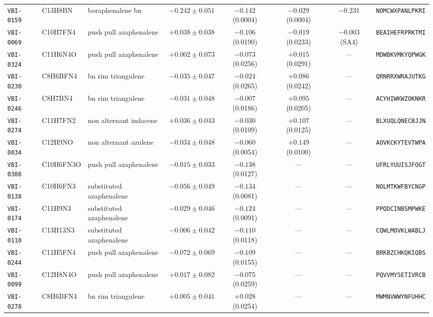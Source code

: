 \documentclass[10pt,a4paper]{article}
\begin{document}
\begin{table}[htbp]
{\begin{tabular}{@{}lllccccc@{}}
\texttt{VBI-0159} & C13H8BN & boraphenalene bn & $-0.242\pm0.051$ & $-0.142$ (0.0004) & $-0.029$ (0.0004) & $-0.231$ & \texttt{\tiny NOMCWXPANLPKRI} \\
\texttt{VBI-0069} & C10H7FN4 & push pull azaphenalene & $+0.038\pm0.038$ & $-0.106$ (0.0190) & $-0.019$ (0.0233) & $-0.003$ (SA4) & \texttt{\tiny BEAIHEFRPRKTMI} \\
\texttt{VBI-0324} & C11H6N4O & push pull azaphenalene & $+0.002\pm0.073$ & $-0.073$ (0.0256) & $+0.015$ (0.0291) & --- & \texttt{\tiny MDWBKVMKYQPWGK} \\
\texttt{VBI-0230} & C8H6BFN4 & bn rim triangulene & $-0.035\pm0.047$ & $-0.024$ (0.0265) & $+0.086$ (0.0242) & --- & \texttt{\tiny QRNRRXWRAJUTKG} \\
\texttt{VBI-0246} & C8H7BN4 & bn rim triangulene & $-0.031\pm0.048$ & $-0.007$ (0.0186) & $+0.095$ (0.0205) & --- & \texttt{\tiny ACYHIWKWZOKNKR} \\
\texttt{VBI-0274} & C11H7FN2 & non alternant indacene & $+0.036\pm0.043$ & $-0.030$ (0.0109) & $+0.107$ (0.0125) & --- & \texttt{\tiny BLXUQLQNECBJJN} \\
\texttt{VBI-0034} & C12H9NO & non alternant azulene & $-0.034\pm0.048$ & $-0.060$ (0.0054) & $+0.149$ (0.0100) & --- & \texttt{\tiny AOVKCKYTEVTWPA} \\
\texttt{VBI-0308} & C10H6FN3O & push pull azaphenalene & $-0.015\pm0.033$ & $-0.138$ (0.0127) & --- & --- & \texttt{\tiny UFRLYUUISJFOGT} \\
\texttt{VBI-0138} & C10H6FN3 & substituted azaphenalene & $-0.056\pm0.049$ & $-0.134$ (0.0081) & --- & --- & \texttt{\tiny NOLMTKWFBYCNGP} \\
\texttt{VBI-0174} & C11H9N3 & substituted azaphenalene & $-0.029\pm0.046$ & $-0.124$ (0.0091) & --- & --- & \texttt{\tiny PPQDCINBSMPWKE} \\
\texttt{VBI-0110} & C13H13N3 & substituted azaphenalene & $-0.006\pm0.042$ & $-0.110$ (0.0118) & --- & --- & \texttt{\tiny CQWLMOVKLWABLJ} \\
\texttt{VBI-0244} & C11H5FN4 & push pull azaphenalene & $-0.072\pm0.069$ & $-0.109$ (0.0155) & --- & --- & \texttt{\tiny BRKBZCHKQKIQBS} \\
\texttt{VBI-0099} & C12H8N4O & push pull azaphenalene & $+0.017\pm0.082$ & $-0.075$ (0.0259) & --- & --- & \texttt{\tiny PQVVMYSETIVRCB} \\
\texttt{VBI-0278} & C8H6BFN4 & bn rim triangulene & $+0.005\pm0.041$ & $+0.028$ (0.0254) & --- & --- & \texttt{\tiny MWMNVWWYNFUHHC} \\
\bottomrule
\end{tabular}}
\end{table}
\end{document}
